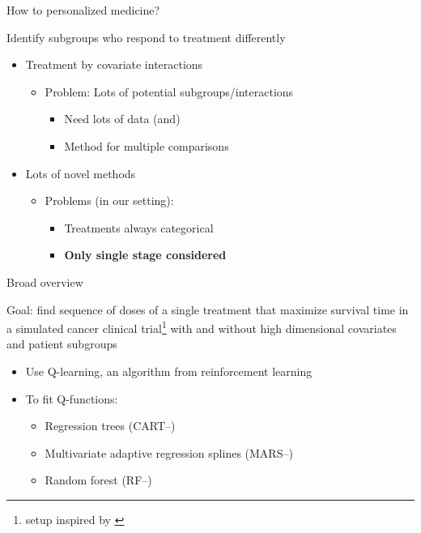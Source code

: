 \documentclass[handout]{beamer}
\begin{document}
\begin{frame}[c]{How to personalized medicine?}

Identify subgroups who respond to treatment differently
\begin{itemize}[<+(1)->]
  \item Treatment by covariate interactions
  \begin{itemize}
    \item Problem: Lots of potential subgroups/interactions
    \begin{itemize}
      \item Need lots of data (and)
      \item Method for multiple comparisons
    \end{itemize}
  \end{itemize}
  \item Lots of novel methods
  \begin{itemize}
    \item Problems (in our setting): 
    \begin{itemize}
      \item Treatments always categorical
      \item \textbf{Only single stage considered}
    \end{itemize}
  \end{itemize}
\end{itemize}

\end{frame}


\begin{frame}[c]{Broad overview}

Goal: find sequence of doses of a single treatment that maximize survival time in a simulated cancer clinical trial\footnote{setup inspired by \textcite{crt}} with and without high dimensional covariates and patient subgroups
\begin{itemize}[<+(1)->]
    \item Use Q-learning, an algorithm from reinforcement learning
    \item To fit Q-functions: 
    \begin{itemize}[<+->]
      \item Regression trees (CART--\cite{CART})
      \item Multivariate adaptive regression splines (MARS--\cite{mars})
      \item Random forest (RF--\cite{rf})
    \end{itemize} 
\end{itemize}

\end{frame}
\end{document}
